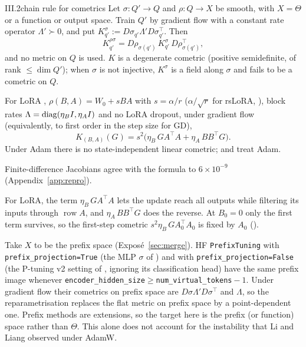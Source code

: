 \begin{observation}{III.2}{chain rule for cometrics}
Let $\sigma:Q'\to Q$ and $\rho:Q\to X$ be smooth, with $X=\Theta$ or a function or output space. Train $Q'$ by gradient flow with a constant rate operator $\Lambda'\succ0$, and put $K^\sigma_{q'}:=D\sigma_{q'}\Lambda'D\sigma_{q'}^\top$. Then
\[K^{\rho\sigma}_{q'}=D\rho_{\sigma(q')}\,K^\sigma_{q'}\,D\rho_{\sigma(q')}^\top,\]
and no metric on $Q$ is used. $K$ is a degenerate cometric (positive semidefinite, of rank $\le\dim Q'$); when $\sigma$ is not injective, $K^\sigma$ is a field along $\sigma$ and fails to be a cometric on $Q$.

For LoRA \citep{hu2021lora}, $\rho(B,A)=W_0+sBA$ with $s=\alpha/r$ ($\alpha/\sqrt r$ for rsLoRA, \citealp{kalajdzievski2023rank}), block rates $\Lambda=\operatorname{diag}(\eta_BI,\eta_AI)$ and no LoRA dropout, under gradient flow (equivalently, to first order in the step size for GD),
\[K_{(B,A)}(G)=s^2\big(\eta_B\,GA^\top A+\eta_A\,BB^\top G\big).\]
Under Adam there is no state-independent linear cometric;  and  treat Adam.
\end{observation}

\noindent{}\enspace Finite-difference Jacobians agree with the formula to $6\times10^{-9}$ (Appendix~\ref{app:repro}).

\begin{explains}
For LoRA, the term $\eta_B\,GA^\top A$ lets the update reach all outputs while filtering its inputs through $\operatorname{row}A$, and $\eta_A\,BB^\top G$ does the reverse. At $B_0=0$ only the first term survives, so the first-step cometric $s^2\eta_B\,GA_0^\top A_0$ is fixed by $A_0$ ().

\smallskip
Take $X$ to be the prefix space (Exposé~\ref{sec:merge}). HF \texttt{PrefixTuning} with \texttt{prefix\_projection=True} (the MLP $\sigma$ of \citealp{li2021prefix}) and with \texttt{prefix\_projection=False} (the P-tuning v2 setting of \citealp{liu2021p}, ignoring its classification head) have the same prefix image whenever \texttt{encoder\_hidden\_size}${}\ge{}$\texttt{num\_virtual\_tokens}${}-1$. Under gradient flow their cometrics on prefix space are $D\sigma\Lambda'D\sigma^\top$ and $\Lambda$, so the reparametrisation replaces the flat metric on prefix space by a point-dependent one. Prefix methods are extensions, so the target here is the prefix (or function) space rather than $\Theta$. This alone does not account for the instability that Li and Liang observed under AdamW.
\end{explains}

